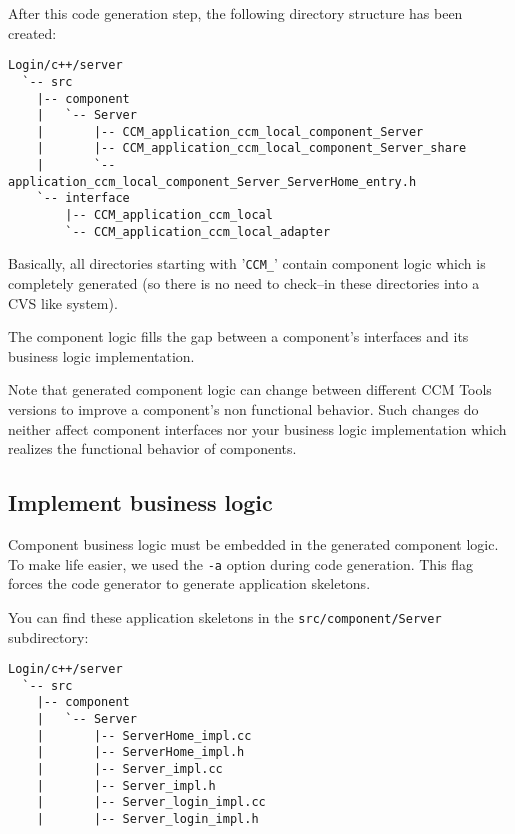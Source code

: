 After this code generation step, the following directory structure has been created:
\begin{verbatim}
Login/c++/server
  `-- src
    |-- component
    |   `-- Server
    |       |-- CCM_application_ccm_local_component_Server
    |       |-- CCM_application_ccm_local_component_Server_share
    |       `-- application_ccm_local_component_Server_ServerHome_entry.h
    `-- interface
        |-- CCM_application_ccm_local
        `-- CCM_application_ccm_local_adapter
\end{verbatim}

Basically, all directories starting with '{\tt CCM\_}' contain component logic
which is completely generated (so there is no need to check--in these directories
into a CVS like system).

\vspace{3mm}
The component logic fills the gap between a component's interfaces and its
business logic implementation. 

\vspace{3mm}
Note that generated component logic can change between different CCM Tools
versions to improve a component's non functional behavior. Such changes do neither
affect component interfaces nor your business logic implementation which
realizes the functional behavior of components.   


\subsection{Implement business logic}
\label{subsection:ImplementBusinessLogic}

Component business logic must be embedded in the generated component logic.
To make life easier, we used the {\tt -a} option during code generation.
This flag forces the code generator to generate application skeletons.

\vspace{3mm}
You can find these application skeletons in the {\tt src/component/Server}
subdirectory:

\begin{verbatim}
Login/c++/server
  `-- src
    |-- component
    |   `-- Server
    |       |-- ServerHome_impl.cc
    |       |-- ServerHome_impl.h
    |       |-- Server_impl.cc
    |       |-- Server_impl.h
    |       |-- Server_login_impl.cc
    |       |-- Server_login_impl.h
\end{verbatim}

